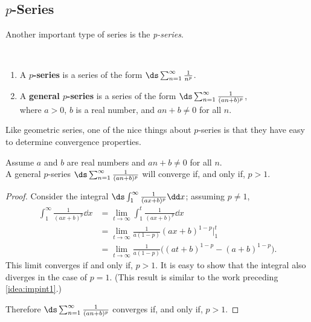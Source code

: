 \subsection{\texorpdfstring{$p$}{p}-Series}

Another important type of series is the \emph{p-series}.

\begin{definition}\label{def:pseries}
\mbox{}\\[-2\baselineskip]\parbox[t]{\linewidth}{%
\begin{enumerate}
\item	A \textbf{$p$-series} is a series of the form
\qquad$\ds\sum_{n=1}^\infty \frac{1}{n^p}$.
\item	A \textbf{general $p$-series} is a series of the form 
\qquad$\ds\sum_{n=1}^\infty \frac{1}{(an+b)^p}$,\medskip\\
where $a>0$, $b$ is a real number, and $an+b\neq 0$ for all $n$.
\end{enumerate}}
\end{definition}

Like geometric series, one of the nice things about $p$-series is that they have easy to determine convergence properties.

\begin{theorem}\label{thm:pseries}
Assume $a$ and $b$ are real numbers and  $an+b\neq 0$ for all $n$.\\
A general $p$-series $\ds\sum_{n=1}^\infty \frac{1}{(an+b)^p}$ will converge if, and only if, $p>1$.
\end{theorem}

\begin{proof}
Consider the integral $\ds\int_1^\infty \frac1{(ax+b)^p}\dd x$; assuming $p\neq 1$,
\begin{align*}
	\int_1^\infty \frac1{(ax+b)^p}\dd x
	&= \lim_{t\to\infty} \int_1^t \frac1{(ax+b)^p}\dd x \\
	&= \lim_{t\to\infty} \frac{1}{a(1-p)}(ax+b)^{1-p}\Big|_1^t\\
	&= \lim_{t\to\infty} \frac{1}{a(1-p)}\bigl((at+b)^{1-p}-(a+b)^{1-p}\bigr).
\end{align*}
This limit converges if and only if, $p>1$. It is easy to show that the integral also diverges in the case of $p=1$. (This result is similar to the work preceding \autoref{idea:impint1}.)

Therefore $\ds \sum_{n=1}^\infty \frac 1{(an+b)^p}$ converges if, and only if, $p>1$.
\end{proof}

